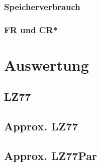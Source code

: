 \subsubsection{Speicherverbrauch}

\subsubsection{FR und CR*}

\section{Auswertung}
\subsection{LZ77}
\subsection{Approx. LZ77}
\subsection{Approx. LZ77Par}